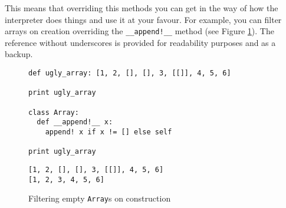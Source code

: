 \documentclass[a4paper,11pt]{article}
\begin{document}
  This means that overriding this methods you can get in the way of how the interpreter does things and use it
  at your favour. For example, you can filter arrays on creation overriding the \texttt{\_\_append!\_\_} method (see Figure
  \ref{override_append}). The reference without underscores is provided for readability purposes and as a backup.
\begin{figure}[h!]
\begin{lstlisting}[language=hal]
def ugly_array: [1, 2, [], [], 3, [[]], 4, 5, 6]

print ugly_array

class Array:
  def __append!__ x:
    append! x if x != [] else self

print ugly_array
\end{lstlisting}
\begin{lstlisting}[language=output]
[1, 2, [], [], 3, [[]], 4, 5, 6]
[1, 2, 3, 4, 5, 6]
\end{lstlisting}
\caption{Filtering empty \texttt{Array}s on construction}
\label{override_append}
\end{figure}
\end{document}

